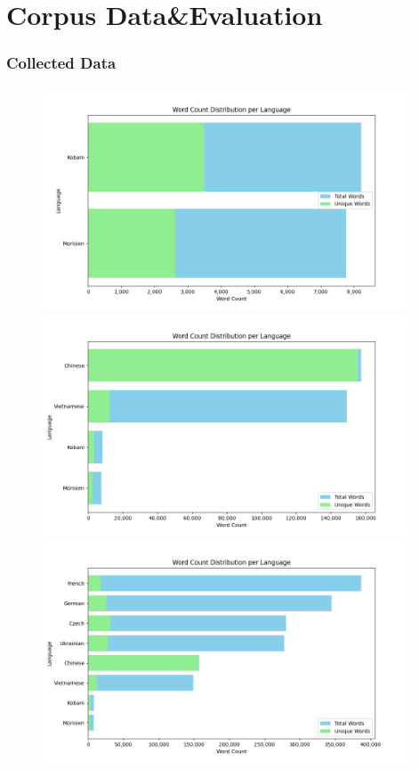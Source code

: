 \documentclass[aspectratio=169]{beamer}
\begin{document}
\section{Corpus Data\&Evaluation}

\begin{frame}[fragile]
	\frametitle{Collected Data}
    \centering
    \hfill\begin{figure}
        \begin{overprint}
        \centering
             \includegraphics[height=6.6cm]{images/mtacr-2024-april.png} 
             \includegraphics[height=6.6cm]{images/mtacr-2024-april-targets.png} 
             \includegraphics[height=6.6cm]{images/mtacr-2024-april-noeng.png}  

\end{overprint}
\end{figure}
\end{frame}
\end{document}
